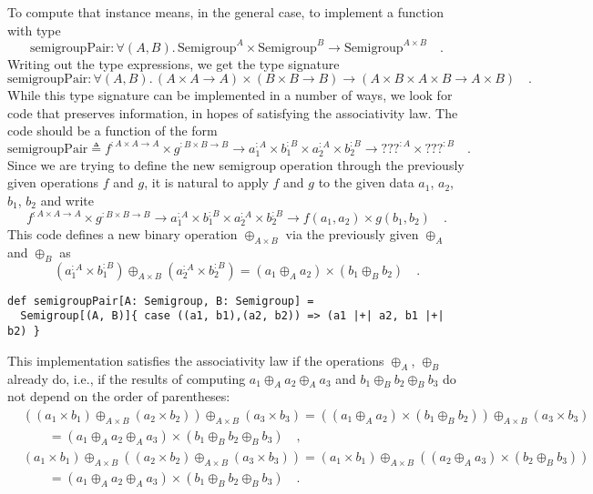 To compute that instance means, in the general case, to implement
a function with type
\[
\text{semigroupPair}:\forall(A,B).\,\text{Semigroup}^{A}\times\text{Semigroup}^{B}\rightarrow\text{Semigroup}^{A\times B}\quad.
\]
Writing out the type expressions, we get the type signature
\[
\text{semigroupPair}:\forall(A,B).\,\left(A\times A\rightarrow A\right)\times\left(B\times B\rightarrow B\right)\rightarrow\left(A\times B\times A\times B\rightarrow A\times B\right)\quad.
\]
While this type signature can be implemented in a number of ways,
we look for code that preserves information, in hopes of satisfying
the associativity law. The code should be a function of the form
\[
\text{semigroupPair}\triangleq f^{:A\times A\rightarrow A}\times g^{:B\times B\rightarrow B}\rightarrow a_{1}^{:A}\times b_{1}^{:B}\times a_{2}^{:A}\times b_{2}^{:B}\rightarrow???^{:A}\times???^{:B}\quad.
\]
Since we are trying to define the new semigroup operation through
the previously given operations $f$ and $g$, it is natural to apply
$f$ and $g$ to the given data $a_{1}$, $a_{2}$, $b_{1}$, $b_{2}$
and write 
\[
f^{:A\times A\rightarrow A}\times g^{:B\times B\rightarrow B}\rightarrow a_{1}^{:A}\times b_{1}^{:B}\times a_{2}^{:A}\times b_{2}^{:B}\rightarrow f(a_{1},a_{2})\times g(b_{1},b_{2})\quad.
\]
This code defines a new binary operation $\oplus_{A\times B}$ via
the previously given $\oplus_{A}$ and $\oplus_{B}$ as
\begin{equation}
(a_{1}^{:A}\times b_{1}^{:B})\oplus_{A\times B}(a_{2}^{:A}\times b_{2}^{:B})=(a_{1}\oplus_{A}a_{2})\times(b_{1}\oplus_{B}b_{2})\quad.\label{eq:semigroup-product-operation-def}
\end{equation}
\begin{lstlisting}
def semigroupPair[A: Semigroup, B: Semigroup] =
  Semigroup[(A, B)]{ case ((a1, b1),(a2, b2)) => (a1 |+| a2, b1 |+| b2) }
\end{lstlisting}
This implementation satisfies the associativity law if the operations
$\oplus_{A}$, $\oplus_{B}$ already do, i.e., if the results of computing
$a_{1}\oplus_{A}a_{2}\oplus_{A}a_{3}$ and $b_{1}\oplus_{B}b_{2}\oplus_{B}b_{3}$
do not depend on the order of parentheses:
\begin{align*}
 & \left(\left(a_{1}\times b_{1}\right)\oplus_{A\times B}\left(a_{2}\times b_{2}\right)\right)\oplus_{A\times B}\left(a_{3}\times b_{3}\right)=\left((a_{1}\oplus_{A}a_{2})\times(b_{1}\oplus_{B}b_{2})\right)\oplus_{A\times B}\left(a_{3}\times b_{3}\right)\\
 & \quad\quad=\left(a_{1}\oplus_{A}a_{2}\oplus_{A}a_{3}\right)\times\left(b_{1}\oplus_{B}b_{2}\oplus_{B}b_{3}\right)\quad,\\
 & \left(a_{1}\times b_{1}\right)\oplus_{A\times B}\left(\left(a_{2}\times b_{2}\right)\oplus_{A\times B}\left(a_{3}\times b_{3}\right)\right)=\left(a_{1}\times b_{1}\right)\oplus_{A\times B}\left((a_{2}\oplus_{A}a_{3})\times(b_{2}\oplus_{B}b_{3})\right)\\
 & \quad\quad=\left(a_{1}\oplus_{A}a_{2}\oplus_{A}a_{3}\right)\times\left(b_{1}\oplus_{B}b_{2}\oplus_{B}b_{3}\right)\quad.
\end{align*}


